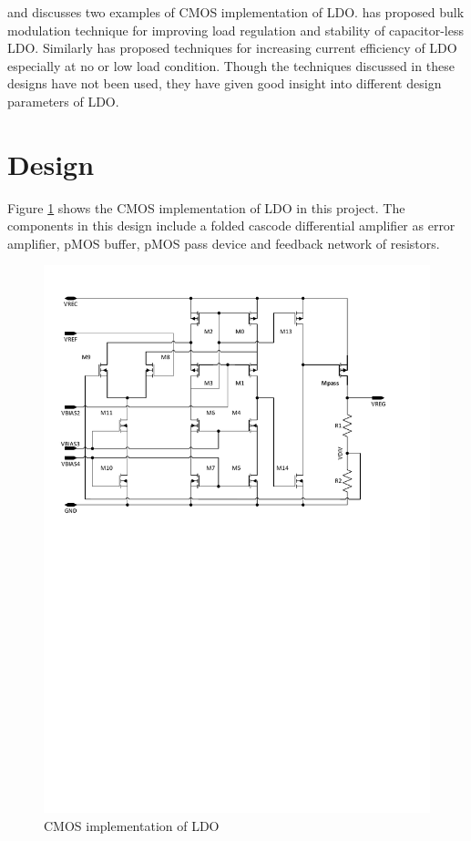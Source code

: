\documentclass[12pt,a4paper,UKenglish]{report}
\begin{document}
\cite{ldo_bulkmod} and \cite{ldo_quiescent} discusses two examples of CMOS implementation of LDO. \cite{ldo_bulkmod} 
has proposed bulk modulation technique for improving load regulation and stability of capacitor-less LDO. 
Similarly \cite{ldo_quiescent} has  proposed techniques for increasing current efficiency of LDO especially at 
no or low load condition. Though the techniques discussed in these designs have not been used, they have given 
good insight into different design parameters of LDO.  \\

\section{Design}		%

Figure \ref{fig:ldo_cmos} shows the CMOS implementation of LDO in this project. The components in this design 
include a folded cascode differential amplifier as error amplifier, pMOS buffer, pMOS pass device and feedback 
network of resistors. \\

\begin{figure}[htbp] %
   \centering
  \includegraphics[width=\textwidth]{img/visio/visio_ldo.pdf} 
   \caption{CMOS implementation of LDO}
   \label{fig:ldo_cmos}
\end{figure}
\end{document}
